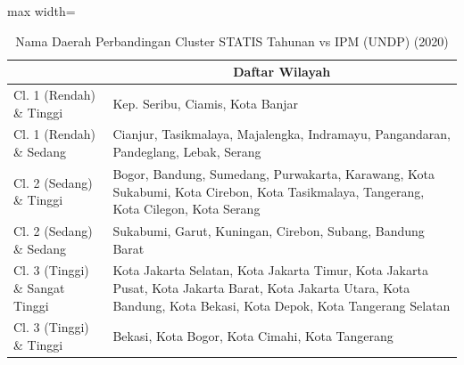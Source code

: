 \begin{table}[H]
\centering
\caption{Nama Daerah Perbandingan Cluster STATIS Tahunan vs IPM (UNDP) (2020)} \label{tab:app1statis_ipm_name_2020}
\begin{adjustbox}{max width=\textwidth}
\begin{tabular}{|>{\centering\arraybackslash}p{4cm}|p{10cm}|}
\hline
\multicolumn{1}{|c|}{\textbf{Kategori}} & \multicolumn{1}{c|}{\textbf{Daftar Wilayah}} \\
\hline
Cl. 1 (Rendah) \& Tinggi & Kep. Seribu, Ciamis, Kota Banjar \\
\hline
Cl. 1 (Rendah) \& Sedang & Cianjur, Tasikmalaya, Majalengka, Indramayu, Pangandaran, Pandeglang, Lebak, Serang \\
\hline
Cl. 2 (Sedang) \& Tinggi & Bogor, Bandung, Sumedang, Purwakarta, Karawang, Kota Sukabumi, Kota Cirebon, Kota Tasikmalaya, Tangerang, Kota Cilegon, Kota Serang \\
\hline
Cl. 2 (Sedang) \& Sedang & Sukabumi, Garut, Kuningan, Cirebon, Subang, Bandung Barat \\
\hline
Cl. 3 (Tinggi) \& Sangat Tinggi & Kota Jakarta Selatan, Kota Jakarta Timur, Kota Jakarta Pusat, Kota Jakarta Barat, Kota Jakarta Utara, Kota Bandung, Kota Bekasi, Kota Depok, Kota Tangerang Selatan \\
\hline
Cl. 3 (Tinggi) \& Tinggi & Bekasi, Kota Bogor, Kota Cimahi, Kota Tangerang \\
\hline
\end{tabular}
\end{adjustbox}
\end{table}